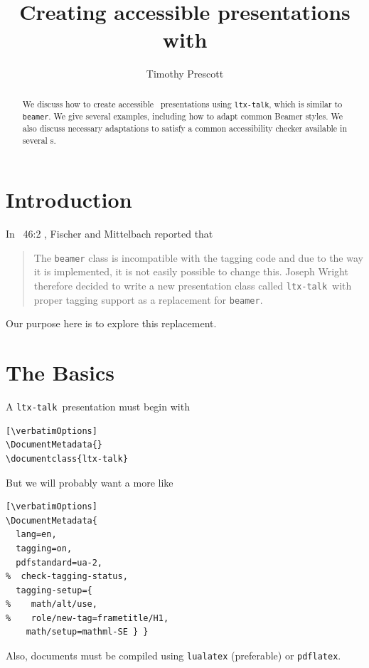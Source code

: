\documentclass{ltugboat}
\title{Creating accessible presentations with \ltxtalk}
\author{Timothy Prescott}
\newcommand{\verbatimOptions}{%
 \IfDocumentMetadataT{setup-code=}\small\makevmeta}
\newcommand{\ltxtalk}{\texttt{ltx-talk}}
\begin{document}
\maketitle

\begin{abstract}
We discuss how to create accessible \PDF\ presentations
using \ltxtalk, which is similar to \texttt{beamer}.
We give several examples, including how to adapt common Beamer styles.
We also discuss necessary adaptations
to satisfy a common accessibility checker available in several s.
\end{abstract}

\section{Introduction}


In \TUB\ 46:2 \cite{Fischer:2025:NLT}, Fischer and Mittelbach reported that
\begin{quote}
The \texttt{beamer} class is incompatible with the tagging
code and due to the way it is implemented, it is
not easily possible to change this. Joseph Wright
therefore decided to write a new presentation class
called \ltxtalk\ with proper tagging support as a
replacement for \texttt{beamer}.
\end{quote}
Our purpose here is to explore this replacement.

\section{The Basics}

A \ltxtalk\ presentation must begin with
\begin{verbatim}[\verbatimOptions]
\DocumentMetadata{}
\documentclass{ltx-talk}
\end{verbatim}
But we will probably want a  more like
\begin{verbatim}[\verbatimOptions]
\DocumentMetadata{
  lang=en,
  tagging=on,
  pdfstandard=ua-2,
%  check-tagging-status,
  tagging-setup={
%    math/alt/use,
%    role/new-tag=frametitle/H1,
    math/setup=mathml-SE } }
\end{verbatim}
Also, documents must be compiled using \texttt{lualatex} (preferable)
or \texttt{pdflatex}.
\end{document}
